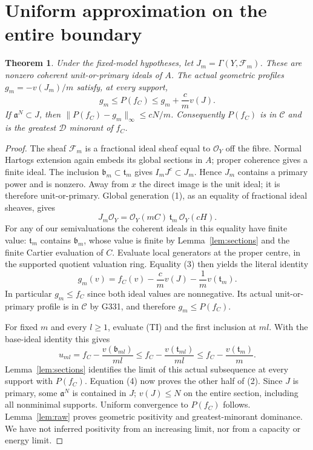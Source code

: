\documentclass[11pt]{article}
\newtheorem{theorem}{Theorem}
\newcommand{\cC}{\mathcal C}
\newcommand{\cD}{\mathcal D}
\newcommand{\OO}{\mathcal O}
\begin{document}
\section{Uniform approximation on the entire boundary}
\begin{theorem}\label{thm:fixed}
Under the fixed-model hypotheses, let $J_m=\Gamma(Y,\mathcal F_m)$.
These are nonzero coherent unit-or-primary ideals of $A$. The actual
geometric profiles $g_m=-v(J_m)/m$ satisfy, at every support,
\[
 g_m\leq P(f_C)\leq g_m+\frac{c}{m}v(J).
\tag{2}
\]
If $\mathfrak a^N\subset J$, then
$\|P(f_C)-g_m\|_\infty\leq cN/m$. Consequently $P(f_C)$ is in $\cC$
and is the greatest $\cD$ minorant of $f_C$.
\end{theorem}
\begin{proof}
The sheaf $\mathcal F_m$ is a fractional ideal sheaf equal to $\OO_Y$
off the fibre. Normal Hartogs extension again embeds its global sections
in $A$; proper coherence gives a finite ideal. The inclusion
$\mathfrak b_m\subset\mathfrak t_m$ gives
$I_m J^c\subset J_m$. Hence $J_m$ contains a primary power and is nonzero.
Away from $x$ the direct image is the unit ideal; it is therefore
unit-or-primary. Global generation (1), as an equality of fractional
ideal sheaves, gives
\[
 J_m\OO_Y=\OO_Y(mC)\,\mathfrak t_m\,\OO_Y(cH).
\tag{3}
\]
For any of our semivaluations the coherent ideals in this equality have
finite value: $\mathfrak t_m$ contains $\mathfrak b_m$, whose value is
finite by Lemma~\ref{lem:sections} and the finite Cartier evaluation of
$C$. Evaluate local generators at the proper centre, in the supported
quotient valuation ring. Equality (3) then yields the literal identity
\[
 g_m(v)=f_C(v)-\frac{c}{m}v(J)-\frac1m v(\mathfrak t_m).
\tag{4}
\]
In particular $g_m\leq f_C$ since both ideal values are nonnegative.
Its actual unit-or-primary profile is in $\cC$ by G331, and therefore
$g_m\leq P(f_C)$.

For fixed $m$ and every $l\geq1$, evaluate (TI) and the first inclusion
at $ml$. With the base-ideal identity this gives
\[
 u_{ml}=f_C-\frac{v(\mathfrak b_{ml})}{ml}
 \leq f_C-\frac{v(\mathfrak t_{ml})}{ml}
 \leq f_C-\frac{v(\mathfrak t_m)}m.
\]
Lemma~\ref{lem:sections} identifies the limit of this actual subsequence
at every support with $P(f_C)$. Equation (4) now proves the other half
of (2). Since $J$ is primary, some $\mathfrak a^N$ is contained in $J$;
$v(J)\leq N$ on the entire section, including all nonminimal supports.
Uniform convergence to $P(f_C)$ follows. Lemma~\ref{lem:raw} proves
geometric positivity and greatest-minorant dominance. We have not inferred
positivity from an increasing limit, nor from a capacity or energy limit.
\end{proof}
\end{document}
